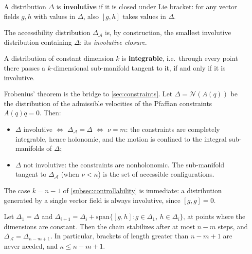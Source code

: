 \begin{definition}
\label{def:involutive}
A distribution \( \Delta \) is \textbf{involutive} if it is closed
under Lie bracket: for any vector fields \( g, h \) with values in
\( \Delta \), also \( [g, h] \) takes values in \( \Delta \).
\end{definition}

The accessibility distribution \( \Delta_{\mathcal{A}} \) is, by
construction, the smallest involutive distribution containing
\( \Delta \): its \emph{involutive closure}.

\begin{theorem}[Frobenius]
\label{thm:frobenius}
A distribution of constant dimension \( k \) is
\textbf{integrable}, i.e.\ through every point there passes a
\( k \)-dimensional sub-manifold tangent to it, if and only if it is
involutive.
\end{theorem}

Frobenius' theorem is the bridge to \cref{sec:constraints}. Let
\( \Delta = \mathcal{N}(A(q)) \) be the distribution of the admissible
velocities of the Pfaffian constraints \( A(q)\dot q = 0 \). Then:
\begin{itemize}
    \item \( \Delta \) involutive \( \iff \) \( \Delta_{\mathcal{A}} =
          \Delta \) \( \iff \) \( \nu = m \): the constraints are
          completely integrable, hence holonomic, and the motion is
          confined to the integral sub-manifolds of \( \Delta \);
    \item \( \Delta \) not involutive: the constraints are
          nonholonomic. The sub-manifold tangent to
          \( \Delta_{\mathcal{A}} \) (when \( \nu < n \)) is the set
          of accessible configurations.
\end{itemize}
The case \( k = n - 1 \) of \cref{subsec:controllability} is immediate:
a distribution generated by a single vector field is always involutive,
since \( [g, g] = 0 \).

\begin{proposition}
\label{prop:chain-stabilizes}
Let \( \Delta_1 = \Delta \) and
\( \Delta_{i+1} = \Delta_i + \text{span}\{[g,h] : g \in \Delta_1,\
h \in \Delta_i\} \), at points where the dimensions are constant. Then
the chain stabilizes after at most \( n - m \) steps, and
\( \Delta_{\mathcal{A}} = \Delta_{n-m+1} \). In particular, brackets of
length greater than \( n - m + 1 \) are never needed, and
\( \kappa \le n - m + 1 \).
\end{proposition}

